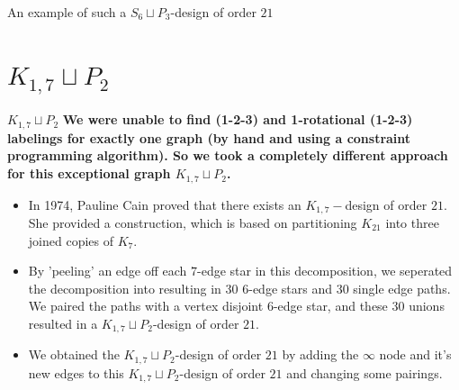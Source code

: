 \documentclass[xcolor=x11names,compress,8pt]{beamer}
\theoremstyle{plain}
\begin{document}
\begin{frame}{An example of such a $S_{6}\sqcup P_{3}$-design of order $21$}
\end{frame}

\section{$K_{1,7}\sqcup P_{2}$}

\begin{frame}{$K_{1,7}\sqcup P_{2}$}
\textbf{We were unable to find (1-2-3) and 1-rotational (1-2-3) labelings for exactly one graph (by hand and using a constraint programming algorithm). So we took a completely different approach for this exceptional graph $K_{1,7}\sqcup P_{2}$.}\newline
\begin{itemize}
    \item In 1974, Pauline Cain proved that there exists an $K_{1,7}-$design of order $21$. She provided a construction, which is based on partitioning $K_{21}$ into three joined copies of $K_{7}$. 
    
    \pause
    
    \item By 'peeling' an edge off each $7$-edge star in this decomposition, we seperated the decomposition into resulting in 30 $6$-edge stars and 30 single edge paths. We paired the paths with a vertex disjoint $6$-edge star, and these 30 unions resulted in a $K_{1,7}\sqcup P_{2}$-design of order $21$.
    
    \pause

    \item We obtained the $K_{1,7}\sqcup P_{2}$-design of order $21$ by adding the $\infty$ node and it's new edges to this $K_{1,7}\sqcup P_{2}$-design of order $21$ and changing some pairings.
    
\end{itemize}

\end{frame}
\end{document}

